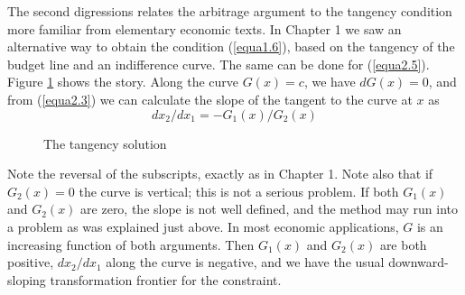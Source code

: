 The second digressions relates the arbitrage argument to the tangency condition more familiar from elementary economic texts. In Chapter 1 we saw an alternative way to obtain the condition (\ref{equa1.6}), based on the tangency of the budget line and an indifference curve. The same can be done for (\ref{equa2.5}). Figure \ref{Fig2.1} shows the story. Along the curve $G(x)=c$, we have $dG(x)=0$, and from (\ref{equa2.3}) we can calculate the slope of the tangent to the curve at $x$ as
\begin{equation}\label{equa2.7}
dx_2 / dx_1 = - G_1(x) / G_2(x)
\end{equation}
\begin{figure}[!tb] %
\centering %
\caption{The tangency solution} %
\label{Fig2.1} %
\end{figure}
Note the reversal of the subscripts, exactly as in Chapter 1. Note also that if $G_2(x)=0$ the curve is vertical; this is not a serious problem. If both $G_1(x)$ and $G_2(x)$ are zero, the slope is not well defined, and the method may run into a problem as was explained just above. In most economic applications, $G$ is an increasing function of both arguments. Then $G_1(x)$ and $G_2(x)$ are both positive, $dx_2 /dx_1$ along the curve is negative, and we have the usual downward-sloping transformation frontier for the constraint.

